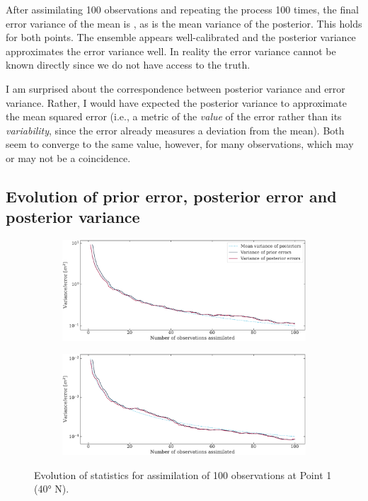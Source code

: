 \documentclass[parskip=half,DIV=16]{scrartcl}
\begin{document}
After assimilating 100 observations and repeating the process 100 times, the final error variance of the mean is , as is the mean variance of the posterior. This holds for both points. The ensemble appears well-calibrated and the posterior variance approximates the error variance well. In reality the error variance cannot be known directly since we do not have access to the truth.

I am surprised about the correspondence between posterior variance and error variance. Rather, I would have expected the posterior variance to approximate the mean squared error (i.e., a metric of the \emph{value} of the error rather than its \emph{variability}, since the error already measures a deviation from the mean). Both seem to converge to the same value, however, for many observations, which may or may not be a coincidence.




\subsection{Evolution of prior error, posterior error and posterior variance}

\begin{figure}[H]
   \centering
   
   \begin{subfigure}[c]{\textwidth}
      \includegraphics[width=\textwidth]{figures/stats_point1_var10.pdf}
   \end{subfigure}
   
   \bigskip
   
   \begin{subfigure}[c]{\textwidth}
      \includegraphics[width=\textwidth]{figures/stats_point1_var01.pdf}
   \end{subfigure}

   \caption{Evolution of statistics for assimilation of 100 observations at Point 1 (\ang{40} N).}
\end{figure}
\end{document}
